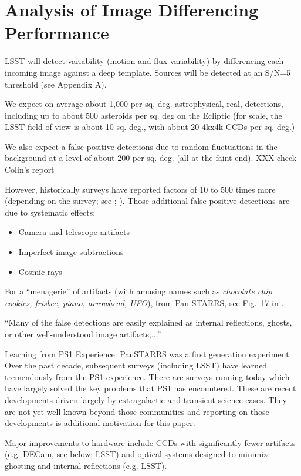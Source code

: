 \section{Analysis of Image Differencing Performance \label{sec:imDiff}}


LSST will detect variability (motion and flux variability) by
differencing each incoming image against a deep template.
Sources will be detected at an S/N=5 threshold (see Appendix A). 

We expect on average about 1,000 per sq. deg. astrophysical, real,
detections, including up to about 500 asteroids per sq. deg on the 
Ecliptic (for scale, the LSST field of view is about 10 sq. deg., with 
about 20 4kx4k CCDs per sq. deg.)

We also expect a false-positive detections due to random
fluctuations in the background at a level of about 200 per
sq. deg. (all at the faint end).  XXX check Colin's report 

However, historically surveys have reported factors of 10 to 500 times
more (depending on the survey; see \citep{denneau13};
\citep{goldstein15} ). 
Those additional false positive
detections are due to systematic effects: 
\begin{itemize} 
\item Camera and telescope artifacts
\item Imperfect image subtractions
\item Cosmic rays
\end{itemize} 

For a ``menagerie'' of artifacts (with amusing names such as 
{\it chocolate chip cookies, frisbee, piano, arrowhead, UFO}), from
Pan-STARRS, see Fig.~17 in \cite{denneau13}. 

``Many of the false detections are easily explained as internal
reflections, ghosts, or other well-understood image artifacts,...''

Learning from PS1 Experience: PanSTARRS was a first generation
experiment. Over the past decade, subsequent surveys (including LSST) 
have learned tremendously from the PS1 experience. There are surveys 
running today which have largely solved the key problems that PS1 has encountered.
These are recent developments driven largely by extragalactic and
transient science cases. They are not yet well known beyond those
communities and reporting on those developments is additional
motivation for this paper. 
 
Major improvements to hardware include CCDs with significantly fewer 
artifacts (e.g. DECam, see below; LSST) and optical systems designed to
minimize ghosting and internal reflections (e.g. LSST). 

